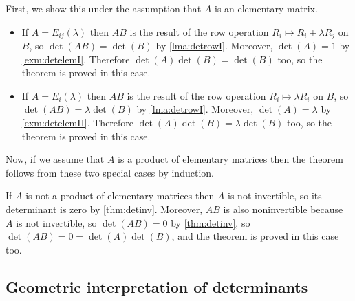 \documentclass{article}
\begin{document}
\begin{Proof}
First, we show this under the assumption that \(A\) is an elementary
matrix.
\begin{itemize}
\item If \(A=E_{ij}(\lambda)\) then \(AB\) is the result of the row
operation \(R_i\mapsto R_i+\lambda R_j\) on \(B\), so
\(\det(AB)=\det(B)\) by \cref{lma:detrowI}. Moreover,
\(\det(A)=1\) by \cref{exm:detelemI}. Therefore
\(\det(A)\det(B)=\det(B)\) too, so the theorem is proved in this
case.
\item If \(A=E_i(\lambda)\) then \(AB\) is the result of the row
operation \(R_i\mapsto \lambda R_i\) on \(B\), so
\(\det(AB)=\lambda\det(B)\) by \cref{lma:detrowI}. Moreover,
\(\det(A)=\lambda\) by \cref{exm:detelemII}. Therefore
\(\det(A)\det(B)=\lambda\det(B)\) too, so the theorem is proved in
this case.
\end{itemize}
Now, if we assume that \(A\) is a product of elementary matrices
then the theorem follows from these two special cases by induction.


If \(A\) is not a product of elementary matrices then \(A\) is not
invertible, so its determinant is zero by
\cref{thm:detinv}. Moreover, \(AB\) is also noninvertible because
\(A\) is not invertible, so \(\det(AB)=0\) by \cref{thm:detinv}, so
\(\det(AB)=0=\det(A)\det(B)\), and the theorem is proved in this
case too. \qedhere


\end{Proof}
\subsection{Geometric interpretation of determinants}
\end{document}
